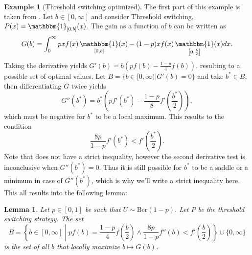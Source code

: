 \documentclass[twoside,a4paper]{article}
\theoremstyle{plain}
\newtheorem{lemma}[theorem]{Lemma}
\theoremstyle{definition}
\newtheorem{example}[theorem]{Example}
\theoremstyle{remark}
\numberwithin{equation}{section}
\DeclareMathOperator{\1}{\mathbbm{1}}
\begin{document}
\begin{example}[Threshold switching optimized]
The first part of this example is taken from \cite{McDonnell11}. Let $b\in[0,\infty]$ and consider Threshold switching, $P(x)=\1_{[0,b]}(x)$. The gain as a function of $b$ can be written as
\[G(b)=\int_0^\infty pxf(x)\1_{[0,b]}(x)-(1-p)xf(x)\1_{\left[0,\frac{b}{2}\right]}(x)dx.\]
Taking the derivative yields $G'(b)=b\left(pf(b)-\frac{1-p}{4}f(b)\right)$, resulting to a possible set of optimal values. Let $B=\{b\in[0,\infty)|G'(b)=0\}$ and take $b^*\in B$, then differentiating $G$ twice yields
\[G''(b^*)=b^*\left(pf'(b^*)-\frac{1-p}{8}f'\left(\frac{b^*}{2}\right)\right),\] which must be negative for $b^*$ to be a local maximum. This results to the condition
\[\frac{8p}{1-p}f'(b^*)< f'\left(\frac{b^*}{2}\right).\]
Note that \cite{McDonnell11} does not have a strict inequality, however the second derivative test is inconclusive when $G''(b^*)=0$. Thus it is still possible for $b^*$ to be a saddle or a minimum in case of $G''(b^*)$, which is why we'll write a strict inequality here. This all results into the following lemma:
\begin{lemma}
Let $p\in[0,1]$ be such that $U\sim\text{Ber}(1-p)$. Let $P$ be the threshold switching strategy. The set
\[B=\left\{b\in[0,\infty]\middle|pf(b)=\frac{1-p}{4}f\left(\frac{b}{2}\right)\land\frac{8p}{1-p}f''(b)<f'\left(\frac{b}{2}\right)\right\}\cup\{0,\infty\}\]
is the set of all $b$ that locally maximize $b\mapsto G(b)$.
\end{lemma}


\end{example}
\end{document}
